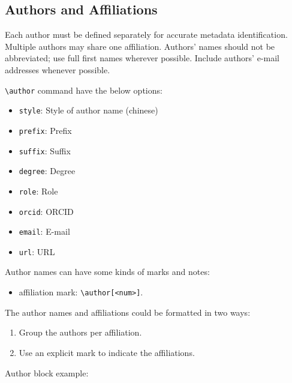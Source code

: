 \documentclass[
]{ceurart}
\begin{document}

\subsection{Authors and Affiliations}

Each author must be defined separately for accurate metadata
identification. Multiple authors may share one affiliation. Authors'
names should not be abbreviated; use full first names wherever
possible. Include authors' e-mail addresses whenever possible.

\verb|\author| command have the below options:

\begin{itemize}
\item \verb|style|: Style of author name (chinese)
\item \verb|prefix|: Prefix
\item \verb|suffix|: Suffix
\item \verb|degree|: Degree
\item \verb|role|: Role
\item \verb|orcid|: ORCID
\item \verb|email|: E-mail
\item \verb|url|: URL
\end{itemize}

Author names can have some kinds of marks and notes:
\begin{itemize}
\item affiliation mark: \verb|\author[<num>]|.
\end{itemize}

The author names and affiliations could be formatted in two ways:
\begin{enumerate}
\item Group the authors per affiliation.
\item Use an explicit mark to indicate the affiliations.
\end{enumerate}

Author block example:
\end{document}

